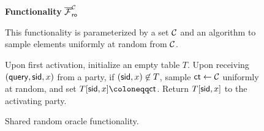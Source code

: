 \begin{figure}[h]
	\begin{center}
		\begin{techbox}
			\centerline{\textbf{Functionality} $\overline{\mathcal{F}}_{\mathsf{ro}}^{\mathcal{C}}$}

			This functionality is parameterized by a set $\mathcal{C}$ and an algorithm to sample elements uniformly at random from $\mathcal{C}$.

			\boxsep

			Upon first activation, initialize an empty table $T$.
			Upon receiving $(\mathsf{query}, {\sf sid}, x)$ from a party, if $({\sf sid}, x) \not\in T$, sample $\mathsf{ct} \gets \mathcal{C}$ uniformly at random, and set $T[\sid, x] \coloneqq \ct$.
			Return $T[{\sf sid}, x]$ to the activating party.
		\end{techbox}
	\end{center}
	\caption{Shared random oracle functionality.}
	\label{fig:func:rand-oracle}
\end{figure}
